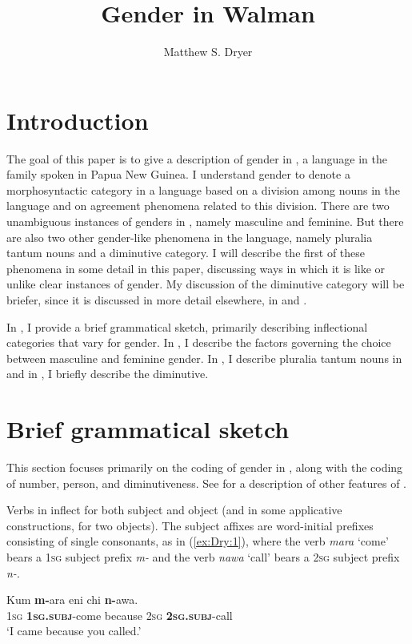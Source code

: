\documentclass[output=collectionpaper]{langsci/langscibook}
\title{Gender in Walman%
}
\author{%
Matthew S. Dryer
\affiliation{University at Buffalo}
}%
\begin{document}
\section{Introduction}

The goal of this paper is to give a description of gender in , a language in the  family spoken in Papua New Guinea. I understand gender to denote a morphosyntactic category in a language based on a division among nouns in the language and on agreement phenomena related to this division. There are two unambiguous instances of genders in , namely masculine and feminine. But there are also two other gender-like phenomena in the language, namely pluralia tantum nouns and a diminutive category. I will describe the first of these phenomena in some detail in this paper, discussing ways in which it is like or unlike clear instances of gender. My discussion of the diminutive category will be briefer, since it is discussed in more detail elsewhere, in \citet{Dryer2016} and \citet{DryerUnderrevision}.

In , I provide a brief grammatical sketch, primarily describing inflectional categories that vary for gender. In , I describe the factors governing the choice between masculine and feminine gender. In , I describe pluralia tantum nouns in  and in , I briefly describe the  diminutive.

\section{Brief grammatical sketch}
\label{sec:Dry:2}

This section focuses primarily on the coding of gender in , along with the coding of number, person, and diminutiveness. See \citet{DryerInpreparation} for a description of other features of .

Verbs in  inflect for both subject and object (and in some applicative constructions, for two objects). The subject affixes are word-initial prefixes consisting of single consonants, as in (\ref{ex:Dry:1}), where the verb \textit{mara} `come' bears a \textsc{1sg} subject prefix \textit{m-} and the verb \textit{nawa} `call' bears a \textsc{2sg} subject prefix \textit{n-}.

\ea \label{ex:Dry:1}
\gll Kum \textbf{m-}ara eni chi \textbf{n-}awa.\\
\textsc{1sg} \textbf{\textsc{1sg.subj}}-come because \textsc{2sg} \textbf{\textsc{2sg.subj}}-call\\
\glt `I came because you called.'
\z
\end{document}
